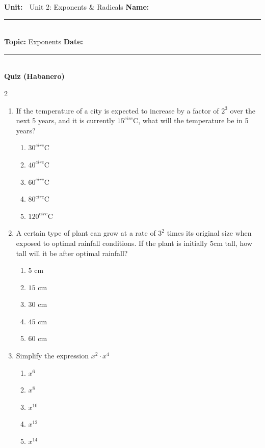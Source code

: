 \documentclass[10pt]{article}
\begin{document}
\enlargethispage{2.5cm}

\begin{tcolorbox}[colback=mainblue!5, colframe=mainblue, sharp corners, boxrule=0.5pt]
    \small \textbf{Unit:} 📘 Unit 2: Exponents & Radicals \hfill \textbf{Name:} \rule{3cm}{0.4pt} \\
    \small \textbf{Topic:} Exponents \hfill \textbf{Date:} \rule{2cm}{0.4pt} \\
    \centering \textbf{\large Quiz (Habanero)}
\end{tcolorbox}

\vspace{0.2cm}

\begin{multicols}{2}
\begin{enumerate}[label=\textbf{Q\arabic*.}, leftmargin=*, itemsep=6pt, parsep=0pt]

  \item \small If the temperature of a city is expected to increase by a factor of $2^3$ over the next 5 years, and it is currently $15^{circ}$C, what will the temperature be in 5 years?
  \begin{enumerate}[label=(\Alph*), leftmargin=0.6cm, nosep, itemsep=2pt]
    \item $30^{circ}$C
    \item $40^{circ}$C
    \item $60^{circ}$C
    \item $80^{circ}$C
    \item $120^{circ}$C
  \end{enumerate}

  \item \small A certain type of plant can grow at a rate of $3^2$ times its original size when exposed to optimal rainfall conditions. If the plant is initially 5cm tall, how tall will it be after optimal rainfall?
  \begin{enumerate}[label=(\Alph*), leftmargin=0.6cm, nosep, itemsep=2pt]
    \item $5$ cm
    \item $15$ cm
    \item $30$ cm
    \item $45$ cm
    \item $60$ cm
  \end{enumerate}

  \item \small Simplify the expression $x^2 \cdot x^4$
  \begin{enumerate}[label=(\Alph*), leftmargin=0.6cm, nosep, itemsep=2pt]
    \item $x^6$
    \item $x^8$
    \item $x^{10}$
    \item $x^{12}$
    \item $x^{14}$
  \end{enumerate}


\end{enumerate}
\end{multicols}
\end{document}
